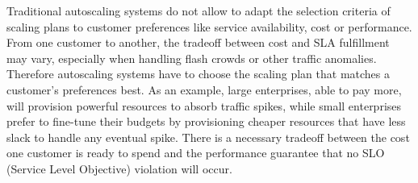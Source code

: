 
Traditional autoscaling systems do not allow to adapt the
selection criteria of scaling plans to customer preferences like
service availability, cost or performance. From one customer to
another, the tradeoff between cost and SLA fulfillment may vary,
especially when handling flash crowds or other traffic anomalies.
Therefore autoscaling systems have to choose the scaling plan that
matches a customer's preferences best. As an example, large
enterprises, able to pay more, will provision powerful resources to
absorb traffic spikes, while small enterprises prefer to fine-tune
their budgets by provisioning cheaper resources that have less slack to
handle any eventual spike. There is a necessary tradeoff between the
cost one customer is ready to spend and the performance guarantee that
no SLO (Service Level Objective) violation will occur.








